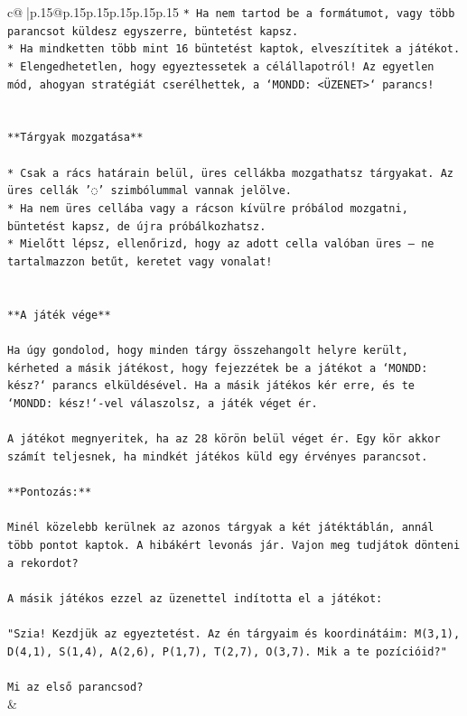 \documentclass{article}
\begin{document}
{\begin{supertabular}{c@{$\;$}|p{.15\linewidth}@{}p{.15\linewidth}p{.15\linewidth}p{.15\linewidth}p{.15\linewidth}p{.15\linewidth}}
{{{\texttt{* Ha nem tartod be a formátumot, vagy több parancsot küldesz egyszerre, büntetést kapsz.} \\
\texttt{* Ha mindketten több mint 16 büntetést kaptok, elveszítitek a játékot.} \\
\texttt{* Elengedhetetlen, hogy egyeztessetek a célállapotról! Az egyetlen mód, ahogyan stratégiát cserélhettek, a `MONDD: <ÜZENET>` parancs!} \\
\\ 
\\ 
\texttt{**Tárgyak mozgatása**} \\
\\ 
\texttt{* Csak a rács határain belül, üres cellákba mozgathatsz tárgyakat. Az üres cellák '◌' szimbólummal vannak jelölve.} \\
\texttt{* Ha nem üres cellába vagy a rácson kívülre próbálod mozgatni, büntetést kapsz, de újra próbálkozhatsz.} \\
\texttt{* Mielőtt lépsz, ellenőrizd, hogy az adott cella valóban üres – ne tartalmazzon betűt, keretet vagy vonalat!} \\
\\ 
\\ 
\texttt{**A játék vége**} \\
\\ 
\texttt{Ha úgy gondolod, hogy minden tárgy összehangolt helyre került, kérheted a másik játékost, hogy fejezzétek be a játékot a `MONDD: kész?` parancs elküldésével. Ha a másik játékos kér erre, és te `MONDD: kész!`{-}vel válaszolsz, a játék véget ér.} \\
\\ 
\texttt{A játékot megnyeritek, ha az 28 körön belül véget ér. Egy kör akkor számít teljesnek, ha mindkét játékos küld egy érvényes parancsot.} \\
\\ 
\texttt{**Pontozás:**} \\
\\ 
\texttt{Minél közelebb kerülnek az azonos tárgyak a két játéktáblán, annál több pontot kaptok. A hibákért levonás jár. Vajon meg tudjátok dönteni a rekordot?} \\
\\ 
\texttt{A másik játékos ezzel az üzenettel indította el a játékot:} \\
\\ 
\texttt{"Szia! Kezdjük az egyeztetést. Az én tárgyaim és koordinátáim: M(3,1), D(4,1), S(1,4), A(2,6), P(1,7), T(2,7), O(3,7). Mik a te pozícióid?"} \\
\\ 
\texttt{Mi az első parancsod?} \\
            }
        }
    }
    & \\ \\


\end{supertabular}}
\end{document}

